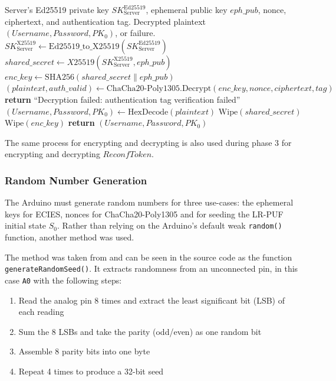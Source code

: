 \begin{algorithm}[ht!]
\caption{$ECIESDecrypt(SK_{\text{Server}}^{\text{Ed25519}}, eph\_pub, nonce, ciphertext, tag)$}
\begin{algorithmic}[1]
    \Require Server's Ed25519 private key $SK_{\text{Server}}^{\text{Ed25519}}$, ephemeral public key $eph\_pub$, nonce, ciphertext, and authentication tag.
    \Ensure  Decrypted plaintext $(Username, Password, PK_0)$, or failure.
    \State $SK_{\text{Server}}^{\text{X25519}} \leftarrow \text{Ed25519\_to\_X25519}(SK_{\text{Server}}^{\text{Ed25519}})$
    \State $shared\_secret \leftarrow X25519(SK_{\text{Server}}^{\text{X25519}}, eph\_pub)$
    \State $enc\_key \leftarrow \text{SHA256}(shared\_secret \mathbin\| eph\_pub)$
    \State $(plaintext, auth\_valid) \leftarrow \text{ChaCha20-Poly1305.Decrypt}(enc\_key, nonce, ciphertext, tag)$
        \State \textbf{return} ``Decryption failed: authentication tag verification failed''
    \EndIf
    \State $(Username, Password, PK_0) \leftarrow \text{HexDecode}(plaintext)$
    \State $\text{Wipe}(shared\_secret)$
    \State $\text{Wipe}(enc\_key)$
    \State \textbf{return} $(Username, Password, PK_0)$
\end{algorithmic}
\label{alg:ecies-decrypt-enroll}
\end{algorithm}

The same process for encrypting and decrypting is also used during phase 3 for encrypting and decrypting $ReconfToken$.

\subsubsection{Random Number Generation}
The Arduino must generate random numbers for three use-cases: the ephemeral keys for ECIES, nonces for ChaCha20-Poly1305 and for seeding the LR-PUF initial state $S_0$. Rather than relying on the Arduino's default weak \texttt{random()} function, another method was used.

The method was taken from \cite{rheingoldheavy2017better} and can be seen in the source code as the function \texttt{generateRandomSeed()}. It extracts randomness from an unconnected pin, in this case \texttt{A0} with the following steps:
\begin{enumerate}
    \item Read the analog pin 8 times and extract the least significant bit (LSB) of each reading
    \item Sum the 8 LSBs and take the parity (odd/even) as one random bit
    \item Assemble 8 parity bits into one byte
    \item Repeat 4 times to produce a 32-bit seed
\end{enumerate}

